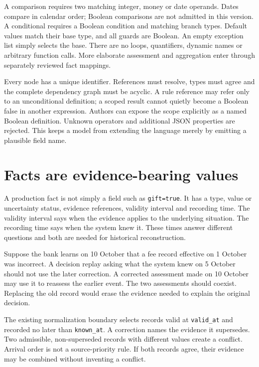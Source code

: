 A comparison requires two matching integer, money or date operands. Dates
compare in calendar order; Boolean comparisons are not admitted in this version.
A conditional requires a Boolean condition and matching branch types. Default
values match their base type, and all guards are Boolean. An empty exception
list simply selects the base. There are no loops, quantifiers, dynamic names or
arbitrary function calls. More elaborate assessment and aggregation enter
through separately reviewed fact mappings.

Every node has a unique identifier. References must resolve, types must agree
and the complete dependency graph must be acyclic. A rule reference may refer
only to an unconditional definition; a scoped result cannot quietly become a
Boolean false in another expression. Authors can expose the scope explicitly
as a named Boolean definition. Unknown operators and additional JSON properties
are rejected. This keeps a model from extending the language merely by emitting
a plausible field name.

\section{Facts are evidence-bearing values}
\label{merge:M07:01}


A production fact is not simply a field such as \texttt{gift=true}. It has a type,
value or uncertainty status, evidence references, validity interval and recording
time. The validity interval says when the evidence applies to the underlying
situation. The recording time says when the system knew it. These times answer
different questions and both are needed for historical reconstruction.

Suppose the bank learns on 10 October that a fee record effective on 1 October
was incorrect. A decision replay asking what the system knew on 5 October should
not use the later correction. A corrected assessment made on 10 October may use
it to reassess the earlier event. The two assessments should coexist. Replacing
the old record would erase the evidence needed to explain the original decision.

The existing normalization boundary selects records valid at \texttt{valid\_at}
and recorded no later than \texttt{known\_at}. A correction names the evidence it
supersedes. Two admissible, non-superseded records with different values create a
conflict. Arrival order is not a source-priority rule. If both records agree,
their evidence may be combined without inventing a conflict.

